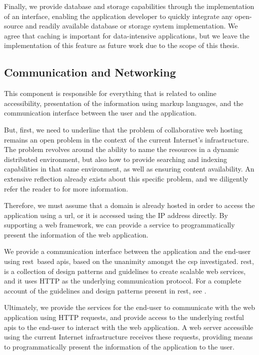 \documentclass[12pt, titlepage]{uo_temp}
\begin{document}
     Finally, we provide database and storage capabilities through the implementation of
     an interface, enabling the application developer to quickly integrate any open-source
     and readily available database or storage system implementation. We agree that
     caching is important for data-intensive applications, but we leave the implementation
     of this feature as future work due to the scope of this thesis.
     
     \subsection{Communication and Networking}\label{arch_comm}
     This component is responsible for everything that is related to online accessibility,
     presentation of the information using markup languages, and the communication interface
     between the user and the application.

     But, first, we need to underline that the problem of collaborative web hosting
     remains an open problem in the context of the current Internet's infrastructure. The
     problem revolves around the ability to name the resources in a dynamic distributed
     environment, but also how to provide searching and indexing capabilities in that same
     environment, as well as ensuring content availability.  An extensive reflection
     already exists about this specific problem, and we diligently refer the reader to
     \cite{ahmed2014collaborative} for more information.
     
     Therefore, we must assume that a domain is already hosted in order to access the
     application using a \gls{url}, or it is accessed using the IP address directly. By
     supporting a web framework, we can provide a service to programmatically present the
     information of the web application.
     
     We provide a communication interface between the application and the end-user using
     \gls{rest}\ based \gls{api}s, based on the unanimity amongst the \gls{csp}
     investigated.  \gls{rest}, is a collection of design patterns and guidelines to
     create scalable web services, and it uses HTTP as the underlying communication
     protocol. For a complete account of the guidelines and design patterns present
     in \gls{rest}, see \cite{richardson2008restful}.

     Ultimately, we provide the services for the end-user to communicate with the web
     application using HTTP requests, and provide access to the underlying \gls{rest}ful
     \gls{api}s to the end-user to interact with the web application. A web server
     accessible using the current Internet infrastructure receives these requests,
     providing means to programmatically present the information of the application to the
     user.
\end{document}
